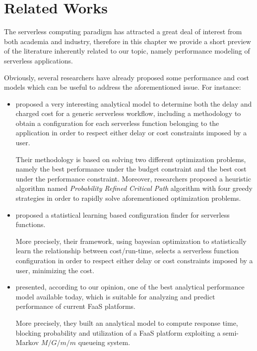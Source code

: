 \documentclass[12pt,a4paper]{report}
\begin{document}
\chapter{Related Works}\label{chapterRelated}

The serverless computing paradigm has attracted a great deal of interest from both academia and industry, therefore in this chapter we provide a short preview of the literature inherently related to our topic, namely performance modeling
of serverless applications.

Obviously, several researchers have already proposed some  performance and cost models which can be useful to address the aforementioned issue. For instance: 

\begin{itemize}
	\item \citet{PMSCP} proposed a very interesting analytical model to determine both the delay and charged cost for a generic serverless workflow, including a methodology to obtain a configuration for each serverless function belonging to the application in order to respect either delay or cost constraints imposed by a user.
	
	Their methodology is based on solving two different optimization problems, namely the best performance under the budget constraint and the best cost under the performance constraint. Moreover, researchers proposed a heuristic algorithm named \textit{Probability Refined Critical Path} algorithm with four greedy
	strategies in order to rapidly solve aforementioned optimization problems. 
	
	\item \citet{COSE} proposed a statistical learning based configuration finder for serverless functions. 
	
	More precisely, their framework, using bayesian optimization to statistically learn the relationship between cost/run-time, selects a serverless function configuration in order to respect either delay or cost constraints imposed by a user, minimizing the cost.
	
	\item \citet{Modelling} presented, according to our opinion, one of the best analytical performance model available today, which is suitable for analyzing and predict performance of current FaaS platforms. 
	
	More precisely, they built an analytical model to compute response time, blocking probability and utilization of a FaaS platform exploiting a semi-Markov $M/G/m/m$ queueing system.


\end{itemize}
\end{document}
